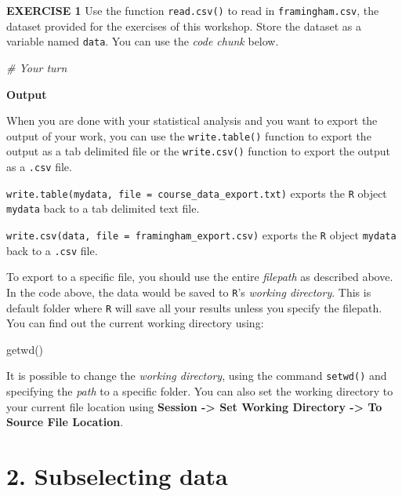\documentclass[
]{article}
\newenvironment{Shaded}{\begin{snugshade}}{\end{snugshade}}
\newcommand{\CommentTok}[1]{\textcolor[rgb]{0.56,0.35,0.01}{\textit{#1}}}
\newcommand{\FunctionTok}[1]{\textcolor[rgb]{0.00,0.00,0.00}{#1}}
\newcommand{\NormalTok}[1]{#1}
\begin{document}
\textbf{EXERCISE 1} Use the function \texttt{read.csv()} to read in
\texttt{framingham.csv}, the dataset provided for the exercises of this
workshop. Store the dataset as a variable named \texttt{data}. You can
use the \emph{code chunk} below.

\begin{Shaded}
\begin{Highlighting}[]
\CommentTok{\# Your turn}
\end{Highlighting}
\end{Shaded}

\textbf{Output}

When you are done with your statistical analysis and you want to export
the output of your work, you can use the \texttt{write.table()} function
to export the output as a tab delimited file or the \texttt{write.csv()}
function to export the output as a \texttt{.csv} file.

\texttt{write.table(mydata,\ file\ =\ \textquotesingle{}course\_data\_export.txt\textquotesingle{})}
exports the \texttt{R} object \texttt{mydata} back to a tab delimited
text file.

\texttt{write.csv(data,\ file\ =\ \textquotesingle{}framingham\_export.csv\textquotesingle{})}
exports the \texttt{R} object \texttt{mydata} back to a \texttt{.csv}
file.

To export to a specific file, you should use the entire \emph{filepath}
as described above. In the code above, the data would be saved to
\texttt{R}'s \emph{working directory}. This is default folder where
\texttt{R} will save all your results unless you specify the filepath.
You can find out the current working directory using:

\begin{Shaded}
\begin{Highlighting}[]
\FunctionTok{getwd}\NormalTok{()}
\end{Highlighting}
\end{Shaded}

It is possible to change the \emph{working directory}, using the command
\texttt{setwd()} and specifying the \emph{path} to a specific folder.
You can also set the working directory to your current file location
using \textbf{Session -\textgreater{} Set Working Directory
-\textgreater{} To Source File Location}.

\hypertarget{subselecting-data}{%
\section{2. Subselecting data}\label{subselecting-data}}
\end{document}
